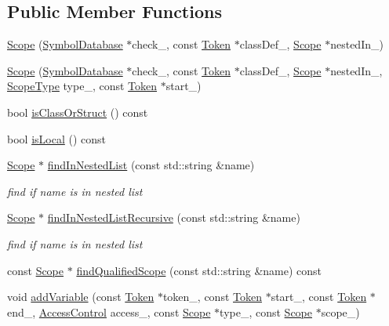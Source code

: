 \subsection*{Public Member Functions}
\begin{DoxyCompactItemize}
\item 
\hyperlink{class_scope_a9858814f634a20dd1ad2340492a52400}{Scope} (\hyperlink{class_symbol_database}{Symbol\-Database} $\ast$check\-\_\-, const \hyperlink{class_token}{Token} $\ast$class\-Def\-\_\-, \hyperlink{class_scope}{Scope} $\ast$nested\-In\-\_\-)
\item 
\hyperlink{class_scope_a121786433d243aa940e3d94f9229e5dc}{Scope} (\hyperlink{class_symbol_database}{Symbol\-Database} $\ast$check\-\_\-, const \hyperlink{class_token}{Token} $\ast$class\-Def\-\_\-, \hyperlink{class_scope}{Scope} $\ast$nested\-In\-\_\-, \hyperlink{class_scope_a62d1e21d98f1a7c1203684eb155e2517}{Scope\-Type} type\-\_\-, const \hyperlink{class_token}{Token} $\ast$start\-\_\-)
\item 
bool \hyperlink{class_scope_a0c235a0f3579be99761c43c32b5de777}{is\-Class\-Or\-Struct} () const 
\item 
bool \hyperlink{class_scope_ab4543f3501109f910079effdf18cf7b2}{is\-Local} () const 
\item 
\hyperlink{class_scope}{Scope} $\ast$ \hyperlink{class_scope_ac8bd897a104180803d084f82026db3d0}{find\-In\-Nested\-List} (const std\-::string \&name)
\begin{DoxyCompactList}\small\item\em find if name is in nested list \end{DoxyCompactList}\item 
\hyperlink{class_scope}{Scope} $\ast$ \hyperlink{class_scope_aaace1015bfd032a468d64427cf24a137}{find\-In\-Nested\-List\-Recursive} (const std\-::string \&name)
\begin{DoxyCompactList}\small\item\em find if name is in nested list \end{DoxyCompactList}\item 
const \hyperlink{class_scope}{Scope} $\ast$ \hyperlink{class_scope_abbbdb84168abfca33dfa33432516e295}{find\-Qualified\-Scope} (const std\-::string \&name) const 
\item 
void \hyperlink{class_scope_a6e0e61380b86bcd12591fe62bc163685}{add\-Variable} (const \hyperlink{class_token}{Token} $\ast$token\-\_\-, const \hyperlink{class_token}{Token} $\ast$start\-\_\-, const \hyperlink{class_token}{Token} $\ast$end\-\_\-, \hyperlink{symboldatabase_8h_a2e9a0288e6c2df2ecebc50944c3ff9fa}{Access\-Control} access\-\_\-, const \hyperlink{class_scope}{Scope} $\ast$type\-\_\-, const \hyperlink{class_scope}{Scope} $\ast$scope\-\_\-)

\end{DoxyCompactItemize}
